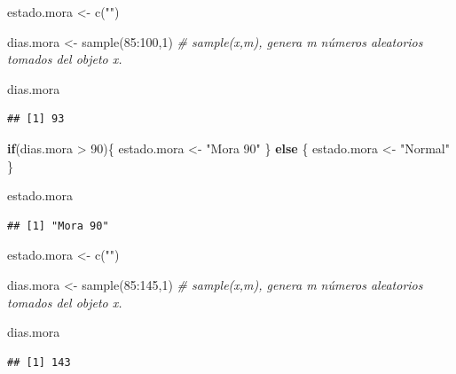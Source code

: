 \documentclass[
  12pt,
]{book}
\newenvironment{Shaded}{\begin{snugshade}}{\end{snugshade}}
\newcommand{\CommentTok}[1]{\textcolor[rgb]{0.56,0.35,0.01}{\textit{#1}}}
\newcommand{\ControlFlowTok}[1]{\textcolor[rgb]{0.13,0.29,0.53}{\textbf{#1}}}
\newcommand{\DecValTok}[1]{\textcolor[rgb]{0.00,0.00,0.81}{#1}}
\newcommand{\FunctionTok}[1]{\textcolor[rgb]{0.00,0.00,0.00}{#1}}
\newcommand{\NormalTok}[1]{#1}
\newcommand{\OtherTok}[1]{\textcolor[rgb]{0.56,0.35,0.01}{#1}}
\newcommand{\SpecialCharTok}[1]{\textcolor[rgb]{0.00,0.00,0.00}{#1}}
\newcommand{\StringTok}[1]{\textcolor[rgb]{0.31,0.60,0.02}{#1}}
\begin{document}
\begin{Shaded}
\begin{Highlighting}[]
\NormalTok{estado.mora }\OtherTok{\textless{}{-}} \FunctionTok{c}\NormalTok{(}\StringTok{""}\NormalTok{)}

\NormalTok{dias.mora }\OtherTok{\textless{}{-}} \FunctionTok{sample}\NormalTok{(}\DecValTok{85}\SpecialCharTok{:}\DecValTok{100}\NormalTok{,}\DecValTok{1}\NormalTok{) }\CommentTok{\# sample(x,m), genera m números aleatorios tomados del objeto x.}

\NormalTok{dias.mora}
\end{Highlighting}
\end{Shaded}

\begin{verbatim}
## [1] 93
\end{verbatim}

\begin{Shaded}
\begin{Highlighting}[]
\ControlFlowTok{if}\NormalTok{(dias.mora }\SpecialCharTok{\textgreater{}} \DecValTok{90}\NormalTok{)\{}
\NormalTok{  estado.mora }\OtherTok{\textless{}{-}} \StringTok{"Mora 90"}
\NormalTok{\} }\ControlFlowTok{else}\NormalTok{ \{}
\NormalTok{  estado.mora }\OtherTok{\textless{}{-}} \StringTok{"Normal"}
\NormalTok{\}}

\NormalTok{estado.mora}
\end{Highlighting}
\end{Shaded}

\begin{verbatim}
## [1] "Mora 90"
\end{verbatim}

\begin{Shaded}
\begin{Highlighting}[]
\NormalTok{estado.mora }\OtherTok{\textless{}{-}} \FunctionTok{c}\NormalTok{(}\StringTok{""}\NormalTok{)}

\NormalTok{dias.mora }\OtherTok{\textless{}{-}} \FunctionTok{sample}\NormalTok{(}\DecValTok{85}\SpecialCharTok{:}\DecValTok{145}\NormalTok{,}\DecValTok{1}\NormalTok{) }\CommentTok{\# sample(x,m), genera m números aleatorios tomados del objeto x.}

\NormalTok{dias.mora}
\end{Highlighting}
\end{Shaded}

\begin{verbatim}
## [1] 143
\end{verbatim}
\end{document}
